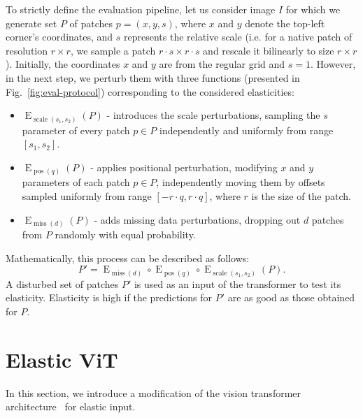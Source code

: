 \documentclass[10pt,twocolumn,letterpaper]{article}
\DeclareMathOperator{\E}{E}
\DeclareMathOperator{\miss}{miss}
\DeclareMathOperator{\scale}{scale}
\DeclareMathOperator{\pos}{pos}
\begin{document}
To strictly define the evaluation pipeline, let us consider image $I$ for which we generate set $P$ of patches $p = (x, y, s)$, where $x$ and $y$ denote the top-left corner's coordinates, and $s$ represents the relative scale (i.e. for a native patch of resolution $r \times r$, we sample a patch $r \cdot s \times r \cdot s$ and rescale it bilinearly to size $r \times r$). Initially, the coordinates $x$ and $y$ are from the regular grid and $s=1$. However, in the next step, we perturb them with three functions (presented in Fig.~\ref{fig:eval-protocol}) corresponding to the considered elasticities:
\begin{itemize}
\item $\E_{\scale(s_1, s_2)}(P)$ - introduces the scale perturbations,  sampling the $s$ parameter of every patch $p \in P$ independently and uniformly from range $[s_1, s_2]$.
\item $\E_{\pos(q)}(P)$ - applies positional perturbation, modifying $x$ and $y$ parameters of each patch $p \in P$, independently moving them by offsets sampled uniformly from range $[-r \cdot q, r \cdot q]$, where $r$ is the size of the patch.
\item $\E_{\miss(d)}(P)$ - adds missing data perturbations, dropping out $d$ patches from $P$ randomly with equal probability. 
\end{itemize}
Mathematically, this process can be described as follows:
\begin{equation*}
P' = \E_{\miss(d)}\circ \E_{\pos(q)}\circ \E_{\scale(s_1,s_2)}(P).
\end{equation*}
A disturbed set of patches $P'$ is used as an input of the transformer to test its elasticity. Elasticity is high if the predictions for $P'$ are as good as those obtained for $P$.

\section{Elastic ViT} \label{sec:ours}

In this section, we introduce a modification of the vision transformer architecture~\cite{dosovitskiy2020vit} for elastic input.

\end{document}
